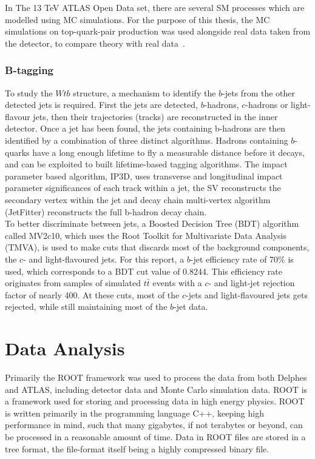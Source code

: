 \documentclass[12pt,a4paper]{article}
\numberwithin{equation}{section}
\begin{document}
In The 13 TeV ATLAS Open Data set, there are several SM processes which are
modelled using MC simulations. For the purpose of this thesis, the MC
simulations on top-quark-pair production was used alongside real data taken from
the detector, to compare theory with real data~\cite{mcopenatlas}.

\subsubsection{B-tagging}
To study the $Wtb$ structure, a mechanism to identify the $b$-jets from the
other detected jets is required. First the jets are detected, $b$-hadrons,
$c$-hadrons or light-flavour jets, then their trajectories (tracks) are
reconstructed in the inner detector. Once a jet has been found, the jets
containing b-hadrons are then identified by a combination of three distinct
algorithms. Hadrons containing $b$-quarks have a long enough lifetime to fly a
measurable distance before it decays, and can be exploited to built
lifetime-based tagging algorithms. The impact parameter based algorithm, IP3D,
uses transverse and longitudinal impact parameter significances of each track
within a jet, the SV reconstructs the secondary vertex within the jet and decay
chain multi-vertex algorithm (JetFitter) reconstructs the full b-hadron
decay chain.\\

To better discriminate between jets, a Boosted Decision Tree (BDT) algorithm
called MV2c10, which uses the Root Toolkit for Multivariate Data Analysis
(TMVA), is used to make cuts that discards most of the background components,
the $c$- and light-flavoured jets. For this report, a $b$-jet efficiency rate of
70\% is used, which corresponds to a BDT cut value of 0.8244. This efficiency
rate originates from samples of simulated $t\bar t$ events with a $c$- and
light-jet rejection factor of nearly 400\cite{ATL-PHYS-PUB-2016-012}. At these
cuts, most of the $c$-jets and light-flavoured jets gets rejected, while still
maintaining most of the $b$-jet data.


\section{Data Analysis}
Primarily the ROOT framework was used to process the data from both Delphes and
ATLAS, including detector data and Monte Carlo simulation data. ROOT is a
framework used for storing and processing data in high energy physics. ROOT is
written primarily in the programming language C++, keeping high performance in
mind, such that many gigabytes, if not terabytes or beyond, can be processed in
a reasonable amount of time. Data in ROOT files are stored in a tree format, the
file-format itself being a highly compressed binary file.\cite{root}
\end{document}
